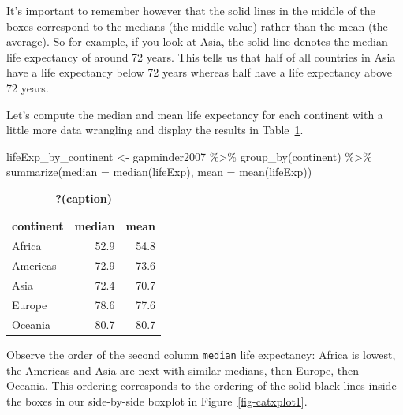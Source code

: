 \documentclass[
  letterpaper,
  DIV=11,
  numbers=noendperiod]{scrreprt}
\newenvironment{Shaded}{\begin{snugshade}}{\end{snugshade}}
\newcommand{\AttributeTok}[1]{\textcolor[rgb]{0.40,0.45,0.13}{#1}}
\newcommand{\FunctionTok}[1]{\textcolor[rgb]{0.28,0.35,0.67}{#1}}
\newcommand{\NormalTok}[1]{\textcolor[rgb]{0.00,0.23,0.31}{#1}}
\newcommand{\OtherTok}[1]{\textcolor[rgb]{0.00,0.23,0.31}{#1}}
\newcommand{\SpecialCharTok}[1]{\textcolor[rgb]{0.37,0.37,0.37}{#1}}
\theoremstyle{definition}
\theoremstyle{remark}
\begin{document}
It's important to remember however that the solid lines in the middle of
the boxes correspond to the medians (the middle value) rather than the
mean (the average). So for example, if you look at Asia, the solid line
denotes the median life expectancy of around 72 years. This tells us
that half of all countries in Asia have a life expectancy below 72 years
whereas half have a life expectancy above 72 years.

Let's compute the median and mean life expectancy for each continent
with a little more data wrangling and display the results in
Table~\ref{tbl-catxplot0}.

\begin{Shaded}
\begin{Highlighting}[]
\NormalTok{lifeExp\_by\_continent }\OtherTok{\textless{}{-}}\NormalTok{ gapminder2007 }\SpecialCharTok{\%\textgreater{}\%}
  \FunctionTok{group\_by}\NormalTok{(continent) }\SpecialCharTok{\%\textgreater{}\%}
  \FunctionTok{summarize}\NormalTok{(}\AttributeTok{median =} \FunctionTok{median}\NormalTok{(lifeExp), }\AttributeTok{mean =} \FunctionTok{mean}\NormalTok{(lifeExp))}
\end{Highlighting}
\end{Shaded}

\begin{table}

\caption{\label{tbl-catxplot0}\textbf{?(caption)}}\begin{minipage}[t]{\linewidth}

{\centering 

\begin{tabular}[t]{lrr}
\toprule
continent & median & mean\\
\midrule
Africa & 52.9 & 54.8\\
Americas & 72.9 & 73.6\\
Asia & 72.4 & 70.7\\
Europe & 78.6 & 77.6\\
Oceania & 80.7 & 80.7\\
\bottomrule
\end{tabular}

}

\end{minipage}%

\end{table}

Observe the order of the second column \texttt{median} life expectancy:
Africa is lowest, the Americas and Asia are next with similar medians,
then Europe, then Oceania. This ordering corresponds to the ordering of
the solid black lines inside the boxes in our side-by-side boxplot in
Figure~\ref{fig-catxplot1}.
\end{document}
